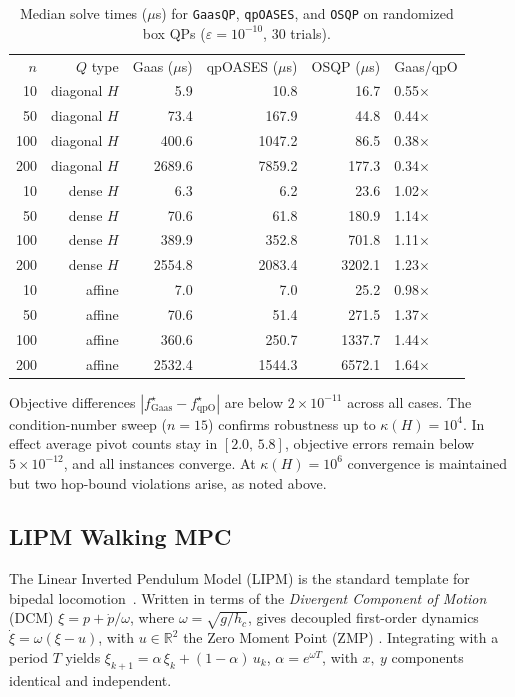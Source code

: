 \documentclass[pdflatex,sn-mathphys-num]{sn-jnl}%
\theoremstyle{thmstyleone}%
\theoremstyle{thmstyletwo}%
\theoremstyle{thmstylethree}%
\theoremstyle{thmstylethree}%
\begin{document}
\begin{table}[h]
\centering
\caption{Median solve times ($\mu$s) for \texttt{GaasQP}, \texttt{qpOASES}, and \texttt{OSQP} on
randomized box QPs ($\varepsilon=10^{-10}$, 30 trials).}
\label{tab:perf}
\smallskip
\begin{tabular}{rrrrrl}
\hline
$n$ & $Q$ type & Gaas ($\mu$s) & qpOASES ($\mu$s) & OSQP ($\mu$s) & Gaas/qpO \\
  10 & diagonal $H$  &    5.9 &   10.8 &   16.7 & 0.55$\times$ \\
  50 & diagonal $H$  &   73.4 &  167.9 &   44.8 & 0.44$\times$ \\
 100 & diagonal $H$  &  400.6 & 1047.2 &   86.5 & 0.38$\times$ \\
 200 & diagonal $H$  & 2689.6 & 7859.2 &  177.3 & 0.34$\times$ \\
\hline
  10 & dense $H$     &    6.3 &    6.2 &   23.6 & 1.02$\times$ \\
  50 & dense $H$     &   70.6 &   61.8 &  180.9 & 1.14$\times$ \\
 100 & dense $H$     &  389.9 &  352.8 &  701.8 & 1.11$\times$ \\
 200 & dense $H$     & 2554.8 & 2083.4 & 3202.1 & 1.23$\times$ \\
\hline
  10 & affine &    7.0 &    7.0 &   25.2 & 0.98$\times$ \\
  50 & affine &   70.6 &   51.4 &  271.5 & 1.37$\times$ \\
 100 & affine &  360.6 &  250.7 & 1337.7 & 1.44$\times$ \\
 200 & affine & 2532.4 & 1544.3 & 6572.1 & 1.64$\times$ \\
\hline
\end{tabular}
\end{table}


Objective differences $|f_{\mathrm{Gaas}}^\star - f_{\mathrm{qpO}}^\star|$ are
below $2\times10^{-11}$ across all cases.
The condition-number sweep ($n=15$) confirms robustness up to $\kappa(H)=10^4$. In effect  average pivot counts stay in $[2.0,\,5.8]$, objective errors remain below
$5\times10^{-12}$, and all instances converge.
At $\kappa(H)=10^6$ convergence is maintained but two hop-bound violations
arise, as noted above.


\subsection{LIPM Walking MPC}\label{sec:bench_lipm}

The Linear Inverted Pendulum Model (LIPM) is the standard template
for bipedal locomotion~\cite{kajita2003biped}.
Written in terms of the \emph{Divergent Component of Motion}
(DCM) $\xi = p + \dot{p}/\omega$, where $\omega=\sqrt{g/h_c}$, gives decoupled
first-order dynamics $\dot{\xi} = \omega(\xi - u)$, with $u\in\mathbb{R}^2$ the
Zero Moment Point (ZMP) \cite{englsberger2015three}.
Integrating with a period $T$ yields
$\xi_{k+1} = \alpha\,\xi_k + (1-\alpha)\,u_k$, $\alpha = e^{\omega T}$,
with $x, \ y$ components identical and independent.
\end{document}
